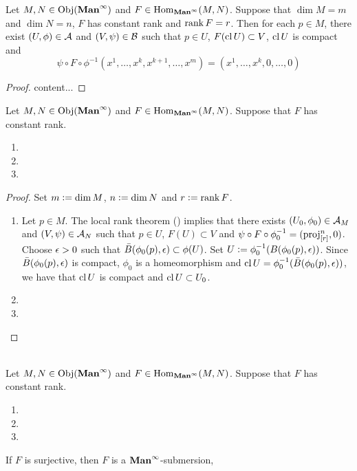 \documentclass{book}
\begin{document}
	\begin{ex}
		Let $M, N \in \operatorname{Obj}(\operatorname*{\text{\textbf{Man}}^{\infty}})$ and $F \in \operatorname{Hom}_{\operatorname*{\text{\textbf{Man}}^{\infty}}}(M, N)$. Suppose that $\dim M = m$ and $\dim N = n$, $F$ has constant rank and $\operatorname{\text{rank}} F = r$. Then for each $p \in M$, there exist $(U, \phi) \in \mathcal{A}$ and $(V, \psi) \in \mathcal{B}$ such that $p \in U$, $F(\operatorname{cl} U) \subset V$, $\operatorname{cl} U$ is compact and 
		$$\psi \circ F \circ \phi^{-1}(x^1, \ldots, x^k, x^{k+1}, \ldots, x^m) = (x^1, \ldots, x^k, 0, \ldots, 0)$$ 
	\end{ex}

	\begin{proof}
		content... 
	\end{proof}

	\begin{ex}
		Let $M,N \in \operatorname{Obj}(\operatorname*{\text{\textbf{Man}}^{\infty}})$ and $F \in \operatorname{Hom}_{\operatorname*{\text{\textbf{Man}}^{\infty}}}(M,N)$. Suppose that $F$ has constant rank. 
		\begin{enumerate}
			\item 
			\item 
			\item 
		\end{enumerate}
	\end{ex}

	\begin{proof} Set $m \vcentcolon= \dim M$, $n \vcentcolon= \dim N$ and $r \vcentcolon= \operatorname{\text{rank}} F$.
		\begin{enumerate}
			\item Let $p \in M$. The local rank theorem () implies that there exists $(U_0, \phi_0) \in \mathcal{A}_M$ and $(V, \psi) \in \mathcal{A}_N$ such that $p \in U$, $F(U) \subset V$ and $\psi \circ F \circ \phi_0^{-1} = (\operatorname{\text{proj}}^n_{[r]}, 0)$. Choose $\epsilon > 0$ such that $\bar{B}(\phi_0(p), \epsilon) \subset \phi(U)$. Set $U \vcentcolon= \phi_0^{-1}(B(\phi_0(p), \epsilon))$. Since $\bar{B}(\phi_0(p), \epsilon)$ is compact, $\phi_0$ is a homeomorphism and $\operatorname{cl} U = \phi_0^{-1}(\bar{B}(\phi_0(p), \epsilon))$, we have that $\operatorname{cl} U$ is compact and $\operatorname{cl} U \subset U_0$.
			\item 
			\item 
		\end{enumerate}
	\end{proof}
	
	\begin{ex}   \\
		Let $M,N \in \operatorname{Obj}(\operatorname*{\text{\textbf{Man}}^{\infty}})$ and $F \in \operatorname{Hom}_{\operatorname*{\text{\textbf{Man}}^{\infty}}}(M,N)$. Suppose that $F$ has constant rank. 
		\begin{enumerate}
			\item 
			\item 
			\item 
		\end{enumerate}
		If $F$ is surjective, then $F$ is a $\operatorname*{\text{\textbf{Man}}^{\infty}}$-submersion,
	\end{ex}
\end{document}

